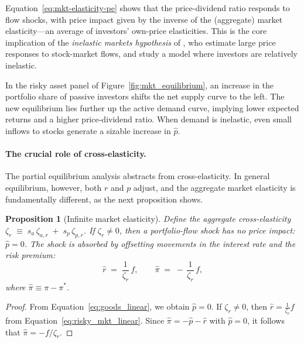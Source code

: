 \documentclass[12pt,english]{article}
\newtheorem{prop}{Proposition}
\begin{document}
Equation~\eqref{eq:mkt-elasticity-pe} shows that the price-dividend ratio responds to flow shocks, with price impact given by the inverse of the (aggregate) market elasticity---an average of investors' own-price elasticities.
This is the core implication of the \emph{inelastic markets hypothesis} of \citet{gabaix2020search}, who estimate large price responses to stock-market flows, and study a model where investors are relatively inelastic.

In the risky asset panel of Figure~\ref{fig:mkt_equilibrium}, an increase in the portfolio share of passive investors shifts the net supply curve to the left.
The new equilibrium lies further up the active demand curve, implying lower expected returns and a higher price-dividend ratio.
When demand is inelastic, even small inflows to stocks generate a sizable increase in $\hat{p}$.

\paragraph{The crucial role of cross-elasticity.}
The partial equilibrium analysis abstracts from cross-elasticity.
In general equilibrium, however, both $r$ and $p$ adjust, and the aggregate market elasticity is fundamentally different, as the next proposition shows.

\begin{prop}[Infinite market elasticity]\label{prop:inf-elasticity}
    Define the aggregate cross-elasticity $\zeta_r \;\equiv\; s_a\,\zeta_{a,r} \;+\; s_p\,\zeta_{p,r}$.
    If $\zeta_r \neq 0$, then a portfolio-flow shock has \emph{no} price impact: $\hat p=0$.
    The shock is absorbed by offsetting movements in the interest rate and the risk premium:
    \[
        \hat r \;=\; \frac{1}{\zeta_r}\,f, 
        \qquad 
        \hat \pi \;=\; -\,\frac{1}{\zeta_r}\,f,
    \]
    where $\hat{\pi} \equiv \pi - \pi^{*}$.
\end{prop}
\begin{proof}
    From Equation~\eqref{eq:goods_linear}, we obtain $\hat{p} = 0$.
    If $\zeta_r \neq 0$, then $\hat{r} = \frac{1}{\zeta_r} f$ from Equation~\eqref{eq:risky_mkt_linear}.
    Since $\hat \pi = -\hat p - \hat r$ with $\hat p=0$, it follows that $\hat \pi = - f/\zeta_r$.
\end{proof}
\end{document}
